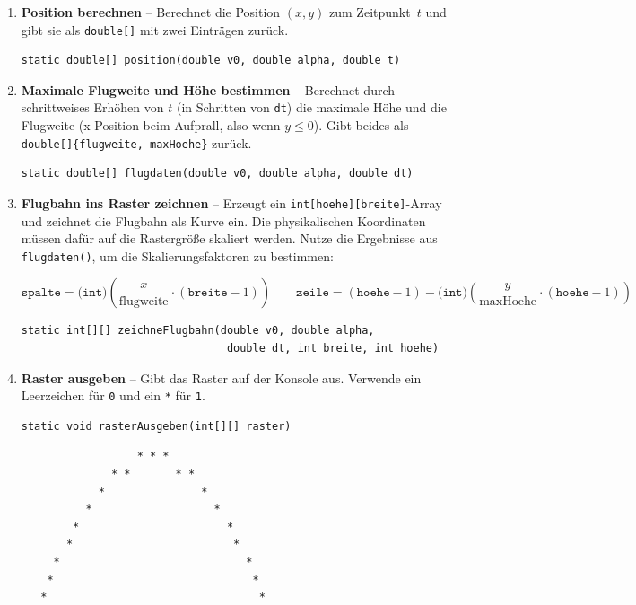 \documentclass[
	fontsize=12pt,          %
	paper=a4,               %
	numbers=noenddot,       %
	listof=totoc,           %
	listof=entryprefix,     %
	listof=nochaptergap,    %
	bibliography=totoc,     %
	parskip=half            %
	openany                 %
]{scrbook}
\begin{document}
\begin{enumerate}[label=\textbf{\alph*)}]

\item \textbf{Position berechnen} -- Berechnet die Position $(x, y)$ zum Zeitpunkt~$t$ und gibt sie als \texttt{double[]} mit zwei Einträgen zurück.

\begin{lstlisting}
static double[] position(double v0, double alpha, double t)
\end{lstlisting}

\item \textbf{Maximale Flugweite und Höhe bestimmen} -- Berechnet durch schrittweises Erhöhen von $t$ (in Schritten von \texttt{dt}) die maximale Höhe und die Flugweite (x-Position beim Aufprall, also wenn $y \leq 0$). Gibt beides als \texttt{double[]\{flugweite, maxHoehe\}} zurück.

\begin{lstlisting}
static double[] flugdaten(double v0, double alpha, double dt)
\end{lstlisting}

\item \textbf{Flugbahn ins Raster zeichnen} -- Erzeugt ein \texttt{int[hoehe][breite]}-Array und zeichnet die Flugbahn als Kurve ein. Die physikalischen Koordinaten müssen dafür auf die Rastergröße skaliert werden. Nutze die Ergebnisse aus \texttt{flugdaten()}, um die Skalierungsfaktoren zu bestimmen:

\[
	\texttt{spalte} = \texttt{(int)}\left(\frac{x}{\text{flugweite}} \cdot (\texttt{breite} - 1)\right)
	\qquad
	\texttt{zeile} = (\texttt{hoehe} - 1) - \texttt{(int)}\left(\frac{y}{\text{maxHoehe}} \cdot (\texttt{hoehe} - 1)\right)
\]

\begin{lstlisting}
static int[][] zeichneFlugbahn(double v0, double alpha,
                                double dt, int breite, int hoehe)
\end{lstlisting}

\item \textbf{Raster ausgeben} -- Gibt das Raster auf der Konsole aus. Verwende ein Leerzeichen für \texttt{0} und ein \texttt{*} für \texttt{1}.

\begin{lstlisting}
static void rasterAusgeben(int[][] raster)
\end{lstlisting}

\begin{beispiel}[{Mögliche Ausgabe ($v_0 = 20$, $\alpha = 45^\circ$, Raster $60 \times 20$)}]
\begin{verbatim}
                  * * *
              * *       * *
            *               *
          *                   *
        *                       *
       *                         *
     *                             *
    *                               *
   *                                 *


\end{verbatim}
\end{beispiel}
\end{enumerate}
\end{document}

